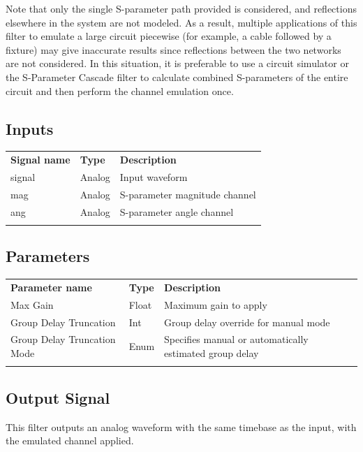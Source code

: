 Note that only the single S-parameter path provided is considered, and reflections elsewhere in the system are not
modeled. As a result, multiple applications of this filter to emulate a large circuit piecewise (for example, a cable
followed by a fixture) may give inaccurate results since reflections between the two networks are not considered. In
this situation, it is preferable to use a circuit simulator or the S-Parameter Cascade filter to calculate combined
S-parameters of the entire circuit and then perform the channel emulation once.

\subsection{Inputs}

\begin{tabularx}{16cm}{llX}
\thickhline
\textbf{Signal name} & \textbf{Type} & \textbf{Description} \\
\thickhline
signal & Analog & Input waveform \\
\thinhline
mag & Analog & S-parameter magnitude channel \\
\thinhline
ang & Analog & S-parameter angle channel \\
\thickhline
\end{tabularx}

\subsection{Parameters}

\begin{tabularx}{16cm}{llX}
\thickhline
\textbf{Parameter name} & \textbf{Type} & \textbf{Description} \\
\thickhline
Max Gain & Float & Maximum gain to apply\\
\thinhline
Group Delay Truncation & Int & Group delay override for manual mode\\
\thinhline
Group Delay Truncation Mode & Enum & Specifies manual or automatically estimated group delay\\
\thickhline
\end{tabularx}

\subsection{Output Signal}

This filter outputs an analog waveform with the same timebase as the input, with the emulated channel applied.

